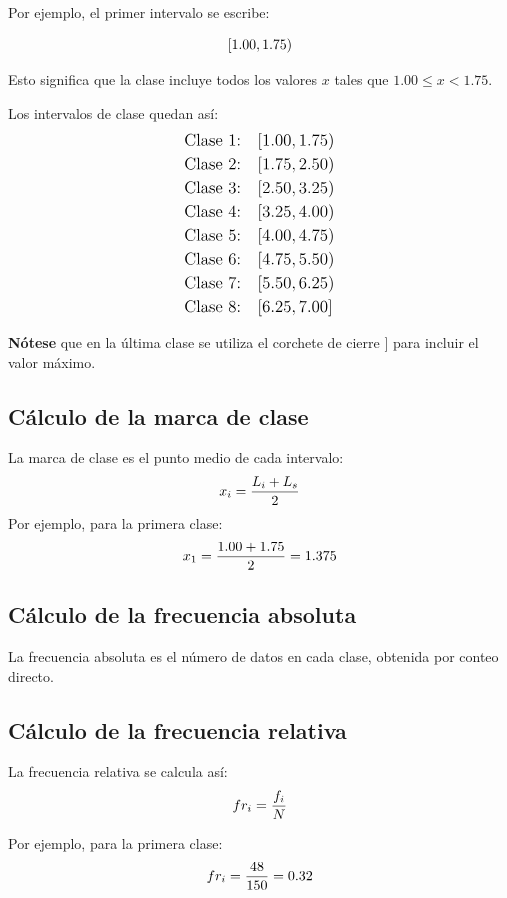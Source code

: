 \documentclass[
  spanish,
  letterpaper,
]{book}
\begin{document}
Por ejemplo, el primer intervalo se escribe:

\[\LARGE [1.00, 1.75)\]

Esto significa que la clase incluye todos los valores \(x\) tales que
\(1.00≤x<1.75\).

Los intervalos de clase quedan así: \[\large \begin{aligned}
\text{Clase 1:} & \quad [1.00, 1.75) \\
\text{Clase 2:} & \quad [1.75, 2.50) \\
\text{Clase 3:} & \quad [2.50, 3.25) \\
\text{Clase 4:} & \quad [3.25, 4.00) \\
\text{Clase 5:} & \quad [4.00, 4.75) \\
\text{Clase 6:} & \quad [4.75, 5.50) \\
\text{Clase 7:} & \quad [5.50, 6.25) \\
\text{Clase 8:} & \quad [6.25, 7.00] \\
\end{aligned}\]

\textbf{Nótese} que en la última clase se utiliza el corchete de cierre
\(]\) para incluir el valor máximo.

\subsection{Cálculo de la marca de
clase}\label{cuxe1lculo-de-la-marca-de-clase}

La marca de clase es el punto medio de cada intervalo:
\[\huge x_i = \frac{L_i + L_s}{2}\] Por ejemplo, para la primera clase:
\[ \huge x_1 = \frac{1.00 + 1.75}{2} = 1.375\]

\subsection{Cálculo de la frecuencia
absoluta}\label{cuxe1lculo-de-la-frecuencia-absoluta}

La frecuencia absoluta es el número de datos en cada clase, obtenida por
conteo directo.

\subsection{Cálculo de la frecuencia
relativa}\label{cuxe1lculo-de-la-frecuencia-relativa}

La frecuencia relativa se calcula así: \[\huge fr_i = \frac{f_i}{N}\]

Por ejemplo, para la primera clase:
\[\huge fr_i = \frac{48}{150} = 0.32\]
\end{document}
